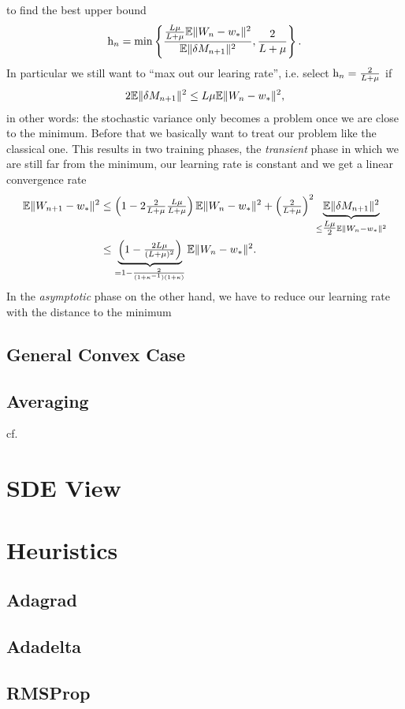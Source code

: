 to find the best upper bound
\begin{align*}
	\text{h}_n
	= \min\left\{\frac{
		\tfrac{L\mu}{L+\mu}\mathbb{E}\|W_n - w_*\|^2
	}{\mathbb{E}\|\delta M_{n+1}\|^2},
	\frac{2}{L+\mu}
	\right\}.
\end{align*}
In particular we still want to ``max out our learing rate'', i.e. select
\(\text{h}_n=\tfrac{2}{L+\mu}\) if
\begin{align*}
	2\mathbb{E}\|\delta M_{n+1}\|^2 \le L\mu \mathbb{E}\|W_n - w_*\|^2,
\end{align*}
in other words: the stochastic variance only becomes a problem once we are
close to the minimum. Before that we basically want to treat our problem like
the classical one. This results in two training phases, the \emph{transient}
phase in which we are still far from the minimum, our learning rate is constant
and we get a linear convergence rate
\begin{align*}
	\mathbb{E}\|W_{n+1} - w_*\|^2
	&\le \left(1-2\tfrac{2}{L+\mu}\tfrac{L\mu}{L+\mu}\right)
	\mathbb{E}\|W_n - w_*\|^2 + \left(\tfrac{2}{L+\mu}\right)^2
	\underbrace{\mathbb{E}\|\delta M_{n+1}\|^2}_{
		\le\tfrac{L\mu}{2} \mathbb{E}\|W_n - w_*\|^2
	}\\
	&\le \underbrace{
		\left(1-\tfrac{2L\mu}{(L+\mu)^2}\right)
	}_{
		=1-\frac{2}{(1+\kappa^{-1})(1+\kappa)}
	}
	\mathbb{E}\|W_n - w_*\|^2.
\end{align*}
In the \emph{asymptotic} phase on the other hand, we have to reduce our learning
rate with the distance to the minimum


\subsection{General Convex Case}

\textcite{nemirovskiRobustStochasticApproximation2009}


\subsection{Averaging}

cf. \cite{bachNonstronglyconvexSmoothStochastic2013}

\section{SDE View}

\textcite{simsekliTailIndexAnalysisStochastic2019}


\section{Heuristics}

\subsection{Adagrad}

\subsection{Adadelta}

\subsection{RMSProp}


\endinput
